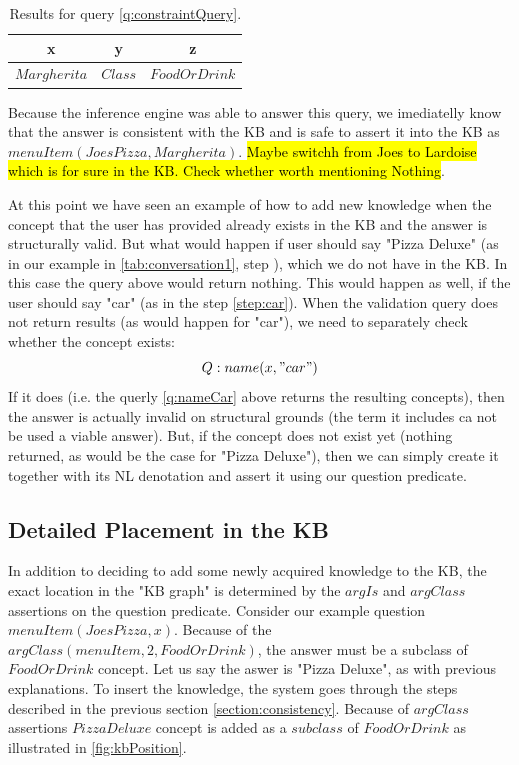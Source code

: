 \begin{table}[H]
\centering
\caption{Results for query \ref{q:constraintQuery}.}
\label{tab:constraintResults}
\begin{tabular}{|c|c|c|}
	\hline
	\textbf{x} & \textbf{y} & \textbf{z} \\
    \hline
    $Margherita$ & $Class$ & $FoodOrDrink$ \\
    \hline
\end{tabular}
\end{table}
Because the inference engine was able to answer this query, we imediatelly
know that the answer is consistent with the KB and is safe to assert it into
the KB as $menuItem(JoesPizza,Margherita)$. \hl{Maybe switchh from Joes to
Lardoise which is for sure in the KB. Check whether worth mentioning Nothing}.

At this point we have seen an example of how to add new knowledge when the
concept that the user has provided already exists in the KB and the answer is 
structurally valid. But what would happen if user should say "Pizza Deluxe" 
(as in our example in \autoref{tab:conversation1}, step 
), which we do not have in the KB. In this case the query
above would return nothing. This would happen as well, if the user should say 
"car" (as in the step \ref{step:car}). When the validation query does not return
results (as would happen for "car"), we need to separately check whether the 
concept exists:
\begin{equation}\label{q:nameCar}
Q:name(x,"car")
\end{equation}
If it does (i.e. the querly \ref{q:nameCar} above returns the resulting 
concepts), then the answer is actually invalid on structural grounds (the term 
it includes ca not be used a viable answer).
But, if the concept does not exist yet (nothing returned, as would be the case 
for "Pizza Deluxe"), then we can simply create it together with its NL 
denotation and assert it using our question predicate.


\subsection{Detailed Placement in the KB}
\label{section:placement}

In addition to deciding to add some newly acquired knowledge to the KB, the 
exact location in the "KB graph" is determined by the $argIs$ and $argClass$
assertions on the question predicate. Consider our example question
$menuItem(JoesPizza,x)$. Because of the $argClass(menuItem,2,FoodOrDrink)$, the
answer must be a subclass of $FoodOrDrink$ concept. Let us say the aswer is
"Pizza Deluxe", as with previous explanations. To insert the knowledge, the 
system goes through the steps described in the previous section 
\ref{section:consistency}. Because of $argClass$ assertions $PizzaDeluxe$ 
concept is added as a $subclass$ of $FoodOrDrink$ as illustrated in 
\autoref{fig:kbPosition}.

